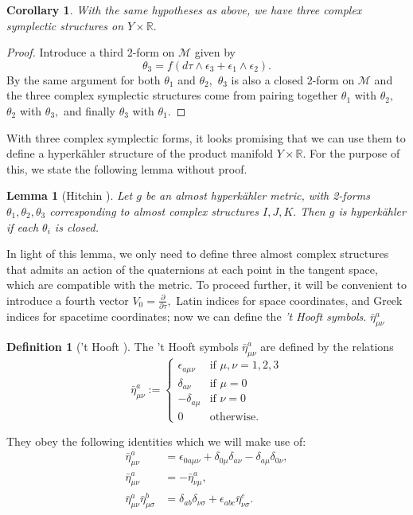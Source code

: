 \documentclass[a4paper,onecolumn,12pt]{article}
\newtheorem{lem}[thm]{Lemma}
\newtheorem{cor}[thm]{Corollary}
\theoremstyle{definition}
\newtheorem{defn}[thm]{Definition}
\theoremstyle{remark}
\newcommand{\m}{\mu}
\newcommand{\n}{\nu}
\newcommand{\e}{\epsilon}
\newcommand{\tta}[1]{\theta_{#1}}
\newcommand{\ddt}[1]{\frac{\partial #1}{\partial \tau}}
\newcommand{\HK}{hyperk\"ahler }
\newcommand{\R}{\mathbb{R}}
\newcommand{\hooft}[3]{\bar{\eta}^{#1}_{#2 #3}}
\begin{document}
\begin{cor}
	With the same hypotheses as above, we have three complex symplectic structures on $Y\times\R.$
\end{cor}
\begin{proof}
	Introduce a third 2-form on $\mathcal{M}$ given by
	\begin{equation*}
	\theta_{3} = f(d\tau \wedge \e_{3} +  \e_{1}\wedge \e_{2}).
	\end{equation*}
	By the same argument for both $\theta_{1}$ and $\theta_{2},$ $\theta_{3}$ is also a closed 2-form on $\mathcal{M}$ and the three complex symplectic structures come from pairing together $\theta_{1}$ with $\theta_{2},$ $\theta_{2}$ with $\theta_{3},$ and finally $\theta_{3}$ with $\theta_{1}.$
\end{proof}
With three complex symplectic forms, it looks promising that we can use them to define a \HK structure of the product manifold $Y\times\R.$ For the purpose of this, we state the following lemma without proof.\\
\begin{lem}[Hitchin \cite{Hitchin_1987}]
	\label{hitchin_lemma}
	Let $g$ be an almost \HK metric, with 2-forms $\tta{1},\tta{2},\tta{3}$ corresponding to almost complex structures $I,J,K.$ Then $g$ is \HK if each $\tta{i}$ is closed.
\end{lem}
In light of this lemma, we only need to define three almost complex structures that admits an action of the quaternions at each point in the tangent space, which are compatible with the metric. To proceed further, it will be convenient to introduce a fourth vector $V_{0} = \ddt{},$ Latin indices for space coordinates, and Greek indices for spacetime coordinates; now we can define the \emph{'t Hooft symbols}. $\hooft{a}{\m}{\n}$\\
\begin{defn}['t Hooft \cite{thooft_1976}]
	The 't Hooft symbols $\hooft{a}{\m}{\n}$ are defined by the relations
	\[
	\bar{\eta}^{a}_{\mu \nu}:= 
	\begin{cases}
	\epsilon_{a\mu\nu}& \text{if } \mu,\nu = 1,2,3\\
	\delta_{a\nu}& \text{if } \mu = 0\\
	-\delta_{a\mu}& \text{if } \nu = 0\\
	0& \text{otherwise.}
	\end{cases}
	\]
\end{defn}
They obey the following identities which we will make use of:
\begin{subequations}
	\begin{align}
	\label{thooft}
	\bar{\eta}^{a}_{\mu \nu} &= \epsilon_{0 a\mu\nu} + \delta_{0\mu}\delta_{a\nu} - \delta_{a\mu}\delta_{0\nu},\\
	\bar{\eta}^{a}_{\mu \nu} &= -\bar{\eta}^{a}_{\nu \mu},\\
	\bar{\eta}^{a}_{\mu \nu}\bar{\eta}^{b}_{\mu \sigma} &= \delta_{ab}\delta_{\nu\sigma} + \epsilon_{abc}\bar{\eta}^{c}_{\nu \sigma}.
	\end{align}
\end{subequations}
\end{document}

